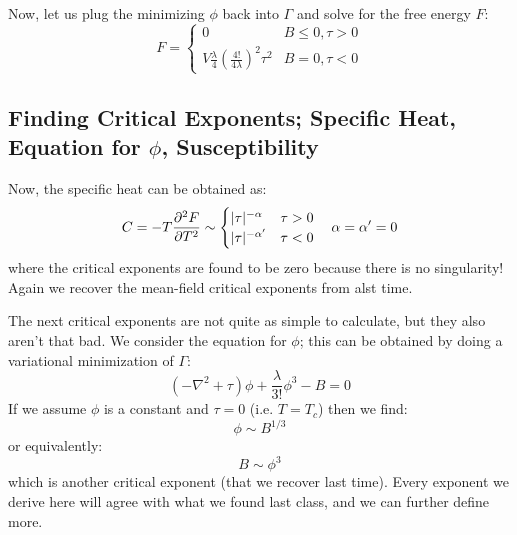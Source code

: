 Now, let us plug the minimizing $\phi$ back into $\Gamma$ and solve for the free energy $F$:
\begin{equation}
    F = \begin{cases}
        0 & B \leq 0, \tau > 0
        \\ V\frac{\lambda}{4}\left(\frac{4!}{4\lambda}\right)^2\tau^2 & B = 0, \tau < 0
    \end{cases}
\end{equation}

\subsection{Finding Critical Exponents; Specific Heat, Equation for $\phi$, Susceptibility}
Now, the specific heat can be obtained as:
\begin{equation}
    C = -T\frac{\partial ^2F}{\partial T^2} \sim \begin{cases}
        \lvert \tau \rvert^{-\alpha} & \tau > 0
       \\  \lvert \tau \rvert^{-\alpha'} & \tau < 0
    \end{cases} \quad \alpha = \alpha' = 0
\end{equation}
where the critical exponents are found to be zero because there is no singularity! Again we recover the mean-field critical exponents from alst time.

The next critical exponents are not quite as simple to calculate, but they also aren't that bad. We consider the equation for $\phi$; this can be obtained by doing a variational minimization of $\Gamma$:
\begin{equation}
    (-\nabla^2 + \tau)\phi + \frac{\lambda}{3!}\phi^3 - B = 0
\end{equation}
If we assume $\phi$ is a constant and $\tau = 0$ (i.e. $T = T_c$) then we find:
\begin{equation}
    \phi \sim B^{1/3}
\end{equation}
or equivalently:
\begin{equation}
    B \sim \phi^3
\end{equation}
which is another critical exponent (that we recover last time). Every exponent we derive here will agree with what we found last class, and we can further define more.

